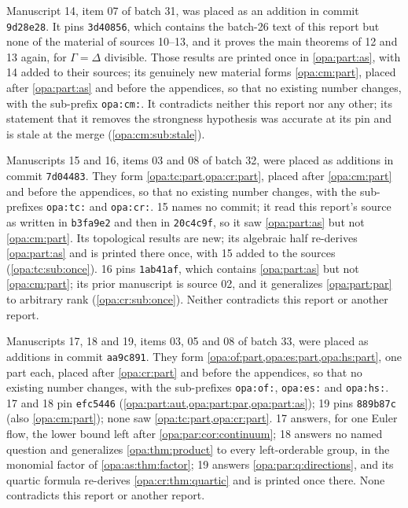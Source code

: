 \documentclass[11pt,oneside]{article}
\numberwithin{equation}{section}
\theoremstyle{definition}
\theoremstyle{remark}
\newcommand{\lbl}[1]{\nolinkurl{#1}}
\begin{document}
Manuscript 14, item 07 of batch 31, was placed as an addition in commit
\texttt{9d28e28}. It pins \texttt{3d40856}, which contains the batch-26 text of
this report but none of the material of sources 10--13, and it proves the main
theorems of 12 and 13 again, for $\Gamma=\Delta$ divisible. Those results are
printed once in \cref{opa:part:as}, with 14 added to their sources; its genuinely
new material forms \cref{opa:cm:part}, placed after \cref{opa:part:as} and before
the appendices, so that no existing number changes, with the sub-prefix
\lbl{opa:cm:}. It contradicts neither this report nor any other; its statement
that it removes the strongness hypothesis was accurate at its pin and is stale at
the merge (\cref{opa:cm:sub:stale}).

Manuscripts 15 and 16, items 03 and 08 of batch 32, were placed as additions in
commit \texttt{7d04483}. They form \cref{opa:tc:part,opa:cr:part}, placed after
\cref{opa:cm:part} and before the appendices, so that no existing number changes,
with the sub-prefixes \lbl{opa:tc:} and \lbl{opa:cr:}. 15 names no commit; it read
this report's source as written in \texttt{b3fa9e2} and then in \texttt{20c4c9f},
so it saw \cref{opa:part:as} but not \cref{opa:cm:part}. Its topological results are
new; its algebraic half re-derives \cref{opa:part:as} and is printed there once,
with 15 added to the sources (\cref{opa:tc:sub:once}). 16 pins \texttt{1ab41af},
which contains \cref{opa:part:as} but not \cref{opa:cm:part}; its prior manuscript is
source 02, and it generalizes \cref{opa:part:par} to arbitrary rank
(\cref{opa:cr:sub:once}). Neither contradicts this report or another report.

Manuscripts 17, 18 and 19, items 03, 05 and 08 of batch 33, were placed as additions in
commit \texttt{aa9c891}. They form \cref{opa:of:part,opa:es:part,opa:hs:part}, one part
each, placed after \cref{opa:cr:part} and before the appendices, so that no existing
number changes, with the sub-prefixes \lbl{opa:of:}, \lbl{opa:es:} and \lbl{opa:hs:}. 17
and 18 pin \texttt{efc5446} (\cref{opa:part:aut,opa:part:par,opa:part:as}); 19 pins
\texttt{889b87c} (also \cref{opa:cm:part}); none saw \cref{opa:tc:part,opa:cr:part}. 17
answers, for one Euler flow, the lower bound left after \cref{opa:par:cor:continuum}; 18
answers no named question and generalizes \cref{opa:thm:product} to every left-orderable
group, in the monomial factor of \cref{opa:as:thm:factor}; 19 answers
\cref{opa:par:q:directions}, and its quartic formula re-derives \cref{opa:cr:thm:quartic}
and is printed once there. None contradicts this report or another report.
\end{document}
